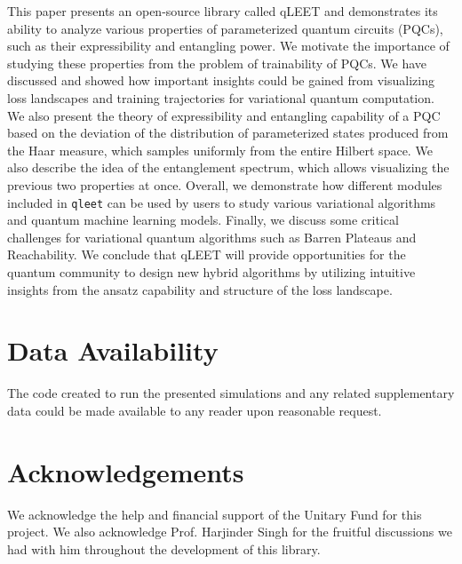 \documentclass[%
 reprint,
 amsmath,
 amssymb,
 showkeys,
 pra,
 floatfix,
]{revtex4-2}
\begin{document}
This paper presents an open-source library called qLEET and demonstrates its ability to analyze various properties of parameterized quantum circuits (PQCs), such as their expressibility and entangling power. We motivate the importance of studying these properties from the problem of trainability of PQCs. We have discussed and showed how important insights could be gained from visualizing loss landscapes and training trajectories for variational quantum computation. We also present the theory of expressibility and entangling capability of a PQC based on the deviation of the distribution of parameterized states produced from the Haar measure, which samples uniformly from the entire Hilbert space. We also describe the idea of the entanglement spectrum, which allows visualizing the previous two properties at once. Overall, we demonstrate how different modules included in \texttt{qleet} can be used by users to study various variational algorithms and quantum machine learning models. Finally, we discuss some critical challenges for variational quantum algorithms such as Barren Plateaus and Reachability. We conclude that qLEET will provide opportunities for the quantum community to design new hybrid algorithms by utilizing intuitive insights from the ansatz capability and structure of the loss landscape.

\section*{Data Availability}
The code created to run the presented simulations and any related supplementary data could be made available to any reader upon reasonable request.

\section*{Acknowledgements}
We acknowledge the help and financial support of the Unitary Fund for this project. We also acknowledge Prof. Harjinder Singh for the fruitful discussions we had with him throughout the development of this library.



%


\end{document}
